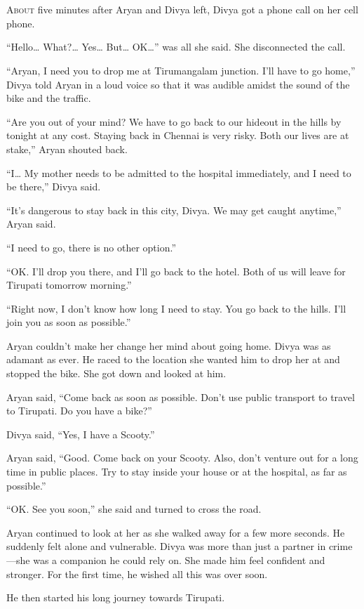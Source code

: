 \chapter{}

\lettrine{A}{bout} five minutes after Aryan and Divya left, Divya got a phone
call on her cell phone.

“Hello… What?… Yes… But… OK…” was all she said. She
disconnected the call.

“Aryan, I need you to drop me at Tirumangalam junction. I'll have to go home,”
Divya told Aryan in a loud voice so that it was audible amidst the sound of
the bike and the traffic.

“Are you out of your mind? We have to go back to our hideout in the hills by
tonight at any cost. Staying back in Chennai is very risky. Both our lives are
at stake,” Aryan shouted back.

“I… My mother needs to be admitted to the hospital immediately, and I need
to be there,” Divya said.

“It's dangerous to stay back in this city, Divya. We may get caught anytime,”
Aryan said.

“I need to go, there is no other option.”

“OK. I'll drop you there, and I'll go back to the hotel. Both of us will leave for
Tirupati tomorrow morning.”

“Right now, I don't know how long I need to stay. You go back to the hills. I'll
join you as soon as possible.”

Aryan couldn't make her change her mind about going home. Divya was as adamant as ever. He
raced to the location she wanted him to drop her at and stopped the bike. She got
down and looked at him.

Aryan said, “Come back as soon as possible. Don't use public transport to travel
to Tirupati. Do you have a bike?”

Divya said, “Yes, I have a Scooty.”

Aryan said, “Good. Come back on your Scooty. Also, don't venture out for a long
time in public places. Try to stay inside your house or at the hospital, as
far as possible.”

“OK. See you soon,” she said and turned to cross the road.

Aryan continued to look at her as she walked away for a few more seconds. He
suddenly felt alone and vulnerable. Divya was more than just a partner in
crime—she was a companion he could rely on. She made him feel confident and
stronger. For the first time, he wished all this was over soon.

He then started his long journey towards Tirupati.
